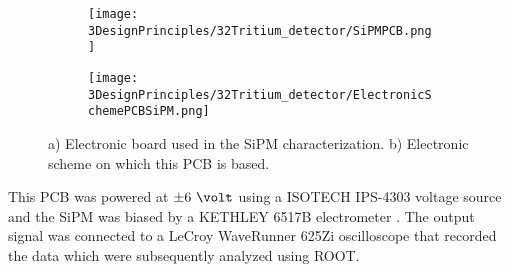 \begin{figure}
\centering
    \begin{subfigure}[b]{0.5\textwidth}
    \centering
    \texttt{[image: 3DesignPrinciples/32Tritium\_detector/SiPMPCB.png]}  
    \caption{\label{subfig:ElectronicBoardSiPM}}
    \end{subfigure}
    \hfill
    \begin{subfigure}[b]{0.45\textwidth}
    \centering
    \texttt{[image: 3DesignPrinciples/32Tritium\_detector/ElectronicSchemePCBSiPM.png]}  
    \caption{\label{subfig:ElectronicSchemePCBSiPM}}
    \end{subfigure}
    \hfill
 \caption{a) Electronic board used in the SiPM characterization. b) Electronic scheme on which this PCB is based.}
 \label{fig:PCBSiPM}
\end{figure}
This PCB was powered at $\pm6~\volt$ using a ISOTECH IPS-4303 voltage source \cite{VoltageSourceISOTECH} and the SiPM was biased by a KETHLEY 6517B electrometer \cite{VoltageSourceKethley}. The output signal was connected to a LeCroy WaveRunner 625Zi oscilloscope \cite{OscilloscopeIFIMED} that recorded the data which were subsequently analyzed using ROOT.